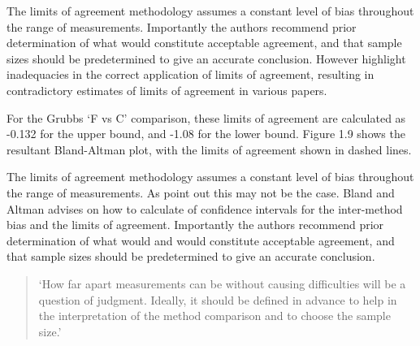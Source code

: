 \documentclass[Main.tex]{subfiles}
\begin{document}
The limits of agreement methodology assumes a constant level of bias throughout the range of measurements. Importantly the authors recommend prior determination of what would constitute acceptable
agreement, and that sample sizes should be predetermined to give an accurate conclusion. However \citet{mantha} highlight inadequacies in the correct application of limits of agreement, resulting in contradictory estimates of limits of agreement in various papers.



For the Grubbs `F vs C' comparison, these limits
of agreement are calculated as -0.132 for the upper bound, and
-1.08 for the lower bound. Figure 1.9 shows the resultant
Bland-Altman plot, with the limits of agreement shown in dashed
lines.


	
	The limits of agreement methodology assumes a constant level of
	bias throughout the range of measurements. As \citet*{BA86} point
	out this may not be the case. Bland and Altman advises on how to
	calculate of confidence intervals for the inter-method bias and
	the limits of agreement. Importantly the authors recommend prior
	determination of what would and would constitute acceptable
	agreement, and that sample sizes should be predetermined to give
	an accurate conclusion.
	
	\begin{quote}
		`How far apart measurements can be without causing difficulties
		will be a question of judgment. Ideally, it should be defined in
		advance to help in the interpretation of the method comparison and
		to choose the sample size.'\citep{BA86}
	\end{quote}
	
\end{document}
